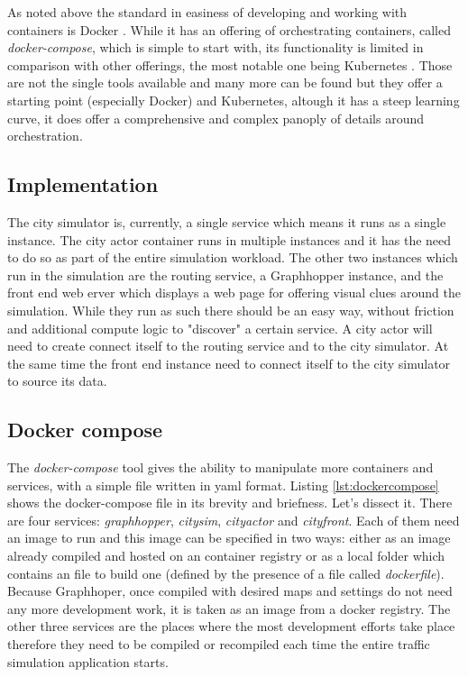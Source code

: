 \documentclass[conference]{IEEEtran}
\begin{document}
As noted above the standard in easiness of developing and working with containers is Docker \citep{docker}. While it has an offering of orchestrating containers, called \textit{docker-compose}, which is simple to start with, its functionality is limited in comparison with other offerings, the most notable one being Kubernetes \citep{Kubernetes}. Those are not the single tools available and many more can be found but they offer a starting point (especially Docker) and Kubernetes, altough it has a steep learning curve, it does offer a comprehensive and complex panoply of details around orchestration.


\subsection{Implementation}

The city simulator is, currently, a single service which means it runs as a single instance. The city actor container runs in multiple instances and it has the need to do so as part of the entire simulation workload. The other two instances which run in the simulation are the routing service, a Graphhopper instance, and the front end web erver which displays a web page for offering visual clues around the simulation. While they run as such there should be an easy way, without friction and additional compute logic to "discover" a certain service. A city actor will need to create connect itself to the routing service and to the city simulator. At the same time the front end instance need to connect itself to the city simulator to source its data.

\subsection{Docker compose}

The \textit{docker-compose} tool gives the ability to manipulate more containers and services, with a simple file written in yaml format. Listing \ref{lst:dockercompose} shows the docker-compose file in its brevity and briefness. Let's dissect it. There are four services: \textit{graphhopper}, \textit{citysim}, \textit{cityactor} and \textit{cityfront}. Each of them need an image to run and this image can be specified in two ways: either as an image already compiled and hosted on an container registry or as a local folder which contains an file to build one (defined by the presence of a file called \textit{dockerfile}). Because Graphhoper, once compiled with desired maps and settings do not need any more development work, it is taken as an image from a docker registry. The other three services are the places where the most development efforts take place therefore they need to be compiled or recompiled each time the entire traffic simulation application starts.
\end{document}
